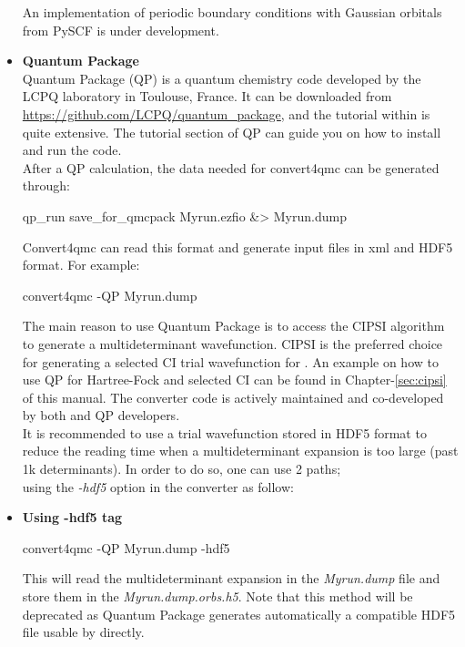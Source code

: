 \begin{itemize}
\begin{itemize}
\end{itemize}

 An implementation of periodic boundary conditions with Gaussian orbitals from PySCF is under development. 

\item \textbf{Quantum Package}\\
Quantum Package\cite{QP} (QP) is a quantum chemistry code developed by the LCPQ laboratory in Toulouse, France. It can be downloaded from \url{https://github.com/LCPQ/quantum_package}, and the tutorial within is quite extensive. The tutorial section of QP can guide you on how to install and run the code.\\
After a QP calculation, the data needed for convert4qmc can be generated through:\\
\begin{shade}
 qp_run save_for_qmcpack Myrun.ezfio &> Myrun.dump
\end{shade}

Convert4qmc can read this format and generate \qmcpack input files in xml and HDF5 format.  For example:

\begin{shade}
 convert4qmc -QP Myrun.dump
\end{shade}


The main reason to use Quantum Package is to access the CIPSI algorithm to generate a multideterminant wavefunction.
CIPSI is the preferred choice for generating a selected CI trial wavefunction for \qmcpack.
An example on how to use QP for Hartree-Fock and selected CI can be found in Chapter-\ref{sec:cipsi}  of this manual.
The converter code is actively maintained and co-developed by both \qmcpack and QP developers.\\

It is recommended to use a trial wavefunction stored in HDF5 format to reduce the reading time when a multideterminant expansion is too large (past 1k determinants). In order to do so, one can use 2 paths;\\
using the \textit{-hdf5} option in the converter as follow:\\

 \item \textbf{Using -hdf5 tag}\\

\begin{shade}
 convert4qmc -QP Myrun.dump -hdf5
\end{shade}

This will read the multideterminant expansion in the \textit{Myrun.dump} file and store them in the \textit{Myrun.dump.orbs.h5}. Note that this method will be deprecated as Quantum Package generates automatically a compatible HDF5 file usable by \qmcpack directly. \\


\end{itemize}
